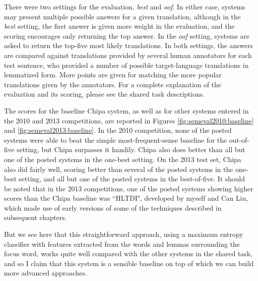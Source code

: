 There were two settings for the evaluation, \emph{best} and \emph{oof}. In
either case, systems may present multiple possible answers for a given
translation, although in the \emph{best} setting, the first answer is given
more weight in the evaluation, and the scoring encourages only returning the
top answer.
In the \emph{oof} setting, systems are asked to return the top-five most likely
translations. In both settings, the answers are compared against translations
provided by several human annotators for each test sentence, who provided a
number of possible target-language translations in lemmatized form.  More
points are given for matching the more popular translations given by the
annotators. For a complete explanation of the evaluation and its scoring,
please see the shared task descriptions.

The scores for the baseline Chipa system, as well as for other systems
entered in the 2010 and 2013 competitions, are reported in Figures
\ref{fig:semeval2010:baseline} and \ref{fig:semeval2013:baseline}.
In the 2010 competition, none of the posted systems were able to beat the
simple most-frequent-sense baseline for the out-of-five setting, but Chipa
surpasses it handily. Chipa also does better than all but one of the posted
systems in the one-best setting. On the 2013 test set, Chipa also did fairly
well, scoring better than several of the posted systems in the one-best
setting, and all but one of the posted systems in the best-of-five. 
It should be noted that in the 2013 competitions, one of the posted systems
showing higher scores than the Chipa baseline was ``HLTDI", developed by myself
and Can Liu\cite{rudnick-liu-gasser:2013:SemEval-2013}, which made use of early
versions of some of the techniques described in subsequent chapters.

But we see here that this straightforward approach, using a maximum entropy
classifier with features extracted from the words and lemmas surrounding the
focus word, works quite well compared with the other systems in the shared
task, and so I claim that this system is a sensible baseline on top of which we
can build more advanced approaches.
